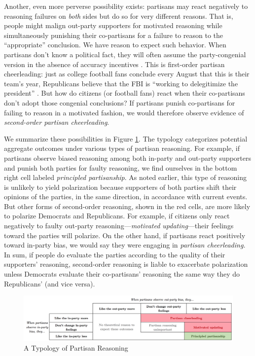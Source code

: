 \documentclass[12pt, letterpaper]{article}
\begin{document}
Another, even more perverse possibility exists: partisans may react negatively to reasoning failures on \emph{both} sides but do so for very different reasons. That is, people might malign out-party supporters for motivated reasoning while simultaneously punishing their co-partisans for a failure to reason to the ``appropriate'' conclusion. We have reason to expect such behavior. When partisans don't know a political fact, they will often assume the party-congenial version in the absence of accuracy incentives \citep{bullocketal_2015}. This is first-order partisan cheerleading: just as college football fans conclude every August that this is their team's year, Republicans believe that the FBI is ``working to delegitimize the president'' \citep{kahn2018most}. But how do citizens (or football fans) react when their co-partisans don't adopt those congenial conclusions? If partisans punish co-partisans for failing to reason in a motivated fashion, we would therefore observe evidence of \emph{second-order partisan cheerleading}.

We summarize these possibilities in Figure \ref{fig:typology}. The typology categorizes potential aggregate outcomes under various types of partisan reasoning. For example, if partisans observe biased reasoning among both in-party and out-party supporters and punish both parties for faulty reasoning, we find ourselves in the bottom right cell labeled \textit{principled partisanship}. As noted earlier, this type of reasoning is unlikely to yield polarization because supporters of both parties shift their opinions of the parties, in the same direction, in accordance with current events. But other forms of second-order reasoning, shown in the red cells, are more likely to polarize Democrats and Republicans. For example, if citizens only react negatively to faulty out-party reasoning---\textit{motivated updating}---their feelings toward the parties will polarize. On the other hand, if partisans react positively toward in-party bias, we would say they were engaging in \textit{partisan cheerleading.} In sum, if people do evaluate the parties according to the quality of their supporters' reasoning, second-order reasoning is liable to exacerbate polarization unless Democrats evaluate their co-partisans' reasoning the same way they do Republicans' (and vice versa).

\begin{figure}
\caption{A Typology of Partisan Reasoning} \label{fig:typology}
\begin{center}
\includegraphics[scale=.48]{../figs/typology2.png}
\end{center}
\end{figure}
\end{document}
